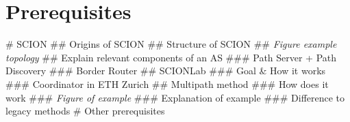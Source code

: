 \documentclass[thesis.tex]{subfiles}
\begin{document}
\chapter{Prerequisites}\label{chap:preq}
    \begin{easylist}
        \MyListProperties
        # SCION
        ## Origins of SCION
        ## Structure of SCION
        ## \textit{Figure example topology}
        ## Explain relevant components of an AS
        ### Path Server + Path Discovery
        ### Border Router
        ## SCIONLab
        ### Goal \& How it works
        ### Coordinator in ETH Zurich
        ## Multipath method
        ### How does it work
        ### \textit{Figure of example}
        ### Explanation of example
        ### Difference to legacy methods
        # Other prerequisites
    \end{easylist}

\subfilebib %
\end{document}
